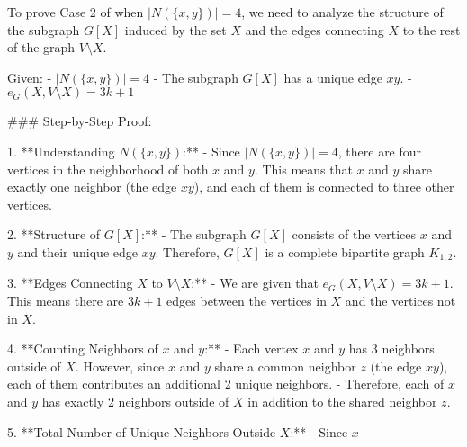 To prove Case 2 of  when \( |N(\{x, y\})| = 4 \), we need to analyze the structure of the subgraph \( G[X] \) induced by the set \( X \) and the edges connecting \( X \) to the rest of the graph \( V \setminus X \).

Given:
- \( |N(\{x, y\})| = 4 \)
- The subgraph \( G[X] \) has a unique edge \( xy \).
- \( e_G(X, V \setminus X) = 3k + 1 \)

### Step-by-Step Proof:

1. **Understanding \( N(\{x, y\}) \):**
   - Since \( |N(\{x, y\})| = 4 \), there are four vertices in the neighborhood of both \( x \) and \( y \). This means that \( x \) and \( y \) share exactly one neighbor (the edge \( xy \)), and each of them is connected to three other vertices.

2. **Structure of \( G[X] \):**
   - The subgraph \( G[X] \) consists of the vertices \( x \) and \( y \) and their unique edge \( xy \). Therefore, \( G[X] \) is a complete bipartite graph \( K_{1,2} \).

3. **Edges Connecting \( X \) to \( V \setminus X \):**
   - We are given that \( e_G(X, V \setminus X) = 3k + 1 \). This means there are \( 3k + 1 \) edges between the vertices in \( X \) and the vertices not in \( X \).

4. **Counting Neighbors of \( x \) and \( y \):**
   - Each vertex \( x \) and \( y \) has 3 neighbors outside of \( X \). However, since \( x \) and \( y \) share a common neighbor \( z \) (the edge \( xy \)), each of them contributes an additional 2 unique neighbors.
   - Therefore, each of \( x \) and \( y \) has exactly 2 neighbors outside of \( X \) in addition to the shared neighbor \( z \).

5. **Total Number of Unique Neighbors Outside \( X \):**
   - Since \( x \)